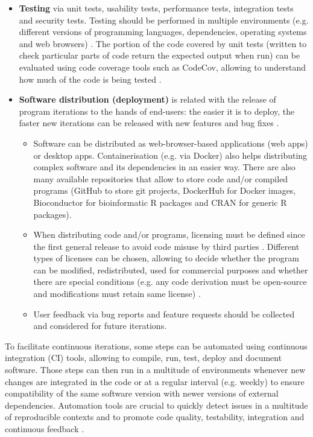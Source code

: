 \begin{itemize}
\begin{itemize}
	\end{itemize}
	\item{\textbf{Testing} via unit tests, usability tests, performance tests, integration tests and security tests. Testing should be performed in multiple environments (e.g. different versions of programming languages, dependencies, operating systems and web browsers) \cite{silva:2017wl,kanat-alexander:2012ve,ford:2021ub}. The portion of the code covered by unit tests (written to check particular parts of code return the expected output when run) can be evaluated using code coverage tools such as CodeCov, allowing to understand how much of the code is being tested \cite{hewitt:2019uj}.}
	\item \textbf{Software distribution (deployment)} is related with the release of program iterations to the hands of end-users: the easier it is to deploy, the faster new iterations can be released with new features and bug fixes \cite{ford:2021ub}.
	\begin{itemize}
		\item Software can be distributed as web-browser-based applications (web apps) or desktop apps. Containerisation (e.g. via Docker) also helps distributing complex software and its dependencies in an easier way. There are also many available repositories that allow to store code and/or compiled programs (GitHub to store git projects, DockerHub for Docker images, Bioconductor for bioinformatic R packages \cite{huber:2015wt} and CRAN for generic R packages).
		\item When distributing code and/or programs, licensing must be defined since the first general release to avoid code misuse by third parties \cite{silva:2017wl}. Different types of licenses can be chosen, allowing to decide whether the program can be modified, redistributed, used for commercial purposes and whether there are special conditions (e.g. any code derivation must be open-source and modifications must retain same license) \cite{silva:2017wl}.
		\item User feedback via bug reports and feature requests should be collected and considered for future  iterations.
	\end{itemize}
\end{itemize}

To facilitate continuous iterations, some steps can be automated using continuous integration (CI) tools, allowing to compile, run, test, deploy and document software. Those steps can then run in a multitude of environments whenever new changes are integrated in the code or at a regular interval (e.g. weekly) to ensure compatibility of the same software version with newer versions of external dependencies. Automation tools are crucial to quickly detect issues in a multitude of reproducible contexts and to promote code quality, testability, integration and continuous feedback \cite{silva:2017wl,hewitt:2019uj,ford:2021ub,storer:2017tr}.

